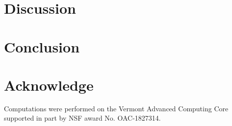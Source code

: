 \documentclass{article}
\begin{document}
\section{Discussion}


\section{Conclusion}


\section{Acknowledge}
Computations were performed on the Vermont Advanced Computing Core supported in part by NSF award No. OAC-1827314.

  
\end{document}
